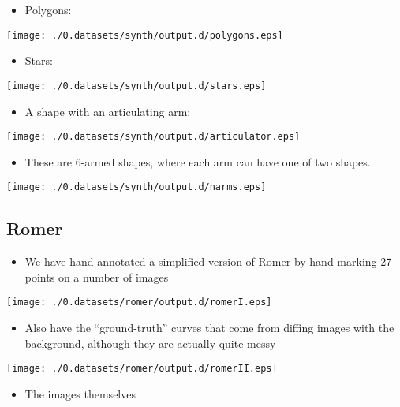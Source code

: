 \documentclass{book}
\begin{document}
\begin{itemize}
\item Polygons:
\end{itemize}

\texttt{[image: ./0.datasets/synth/output.d/polygons.eps]}

\begin{itemize}
\item Stars:
\end{itemize}

\texttt{[image: ./0.datasets/synth/output.d/stars.eps]}

\begin{itemize}
\item A shape with an articulating arm:
\end{itemize}

\texttt{[image: ./0.datasets/synth/output.d/articulator.eps]}

\begin{itemize}
\item These are 6-armed shapes, where each arm can have one of two
    shapes.
\end{itemize}

\texttt{[image: ./0.datasets/synth/output.d/narms.eps]}
\subsection{Romer}
\label{sec-3_1_2}

\begin{itemize}
\item We have hand-annotated a simplified version of Romer by
    hand-marking 27 points on a number of images
\end{itemize}
\texttt{[image: ./0.datasets/romer/output.d/romerI.eps]}

\begin{itemize}
\item Also have the ``ground-truth'' curves that come from diffing images
    with the background, although they are actually quite messy
\end{itemize}
\texttt{[image: ./0.datasets/romer/output.d/romerII.eps]}
\begin{itemize}
\item The images themselves
\end{itemize}
\end{document}
